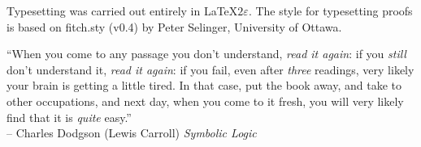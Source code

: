 \vfill

Typesetting was carried out entirely in \LaTeX$2\varepsilon$. The style for typesetting proofs is based on fitch.sty (v0.4) by Peter Selinger, University of Ottawa.






\pagebreak

``When you come to any passage you don't understand, \emph{read it again}: if you \emph{still} don't understand it, \emph{read it again}: if you fail, even after \emph{three} readings, very likely your brain is getting a little tired. In that case, put the book away, and take to other occupations, and next day, when you come to it fresh, you will very likely find that it is \emph{quite} easy.'' \\
-- Charles Dodgson (Lewis Carroll) \emph{Symbolic Logic} \parencite*{Dodgson1896}


\vspace{5cm}
%
